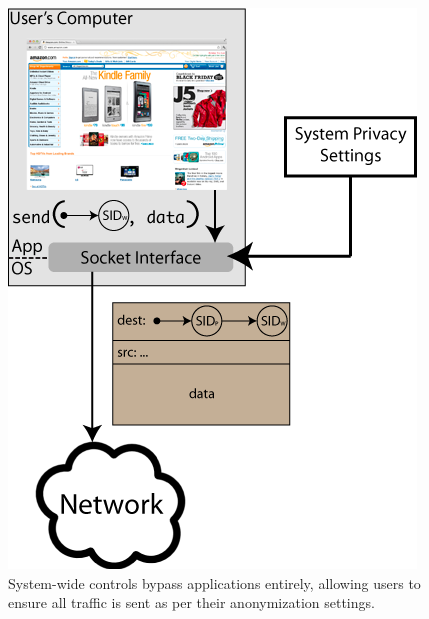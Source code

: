 \documentclass[11pt]{article}
\begin{document}
\begin{figure}
\includegraphics{images/system_anon_settings.png}
\caption{System-wide controls bypass applications entirely, allowing users to ensure all traffic is sent as per their anonymization settings.}
\label{fig:system_anon_settings}
\end{figure}
\end{document}
